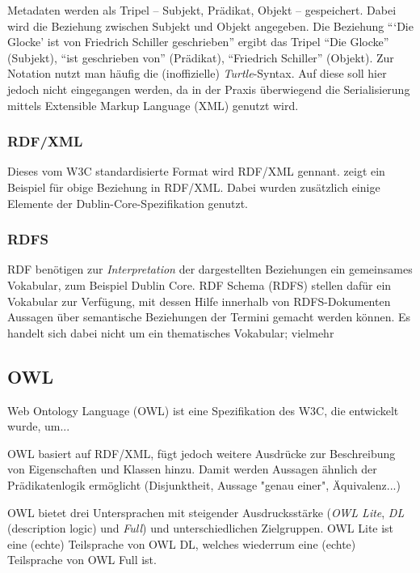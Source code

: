 	Metadaten werden als Tripel -- Subjekt, Prädikat, Objekt -- gespeichert. Dabei wird die Beziehung zwischen Subjekt und Objekt angegeben. Die Beziehung \enquote{\enquote{Die Glocke} ist von Friedrich Schiller geschrieben} ergibt das Tripel \enquote{Die Glocke} (Subjekt), \enquote{ist geschrieben von} (Prädikat), \enquote{Friedrich Schiller} (Objekt). Zur Notation nutzt man häufig die (inoffizielle) \emph{Turtle}-Syntax. %
	Auf diese soll hier jedoch nicht eingegangen werden, da in der Praxis überwiegend die Serialisierung mittels Extensible Markup Language (XML) genutzt wird.
	
	\subsubsection{RDF/XML}
	Dieses vom W3C standardisierte Format wird RDF/XML gennant.  zeigt ein Beispiel für obige Beziehung in RDF/XML. Dabei wurden zusätzlich einige Elemente der Dublin-Core-Spezifikation genutzt.
	

	\subsubsection{RDFS}
	RDF benötigen zur \emph{Interpretation} der dargestellten Beziehungen ein gemeinsames Vokabular, zum Beispiel Dublin Core. RDF Schema (RDFS) stellen dafür ein Vokabular zur Verfügung, mit dessen Hilfe innerhalb von RDFS-Dokumenten Aussagen über semantische Beziehungen der Termini gemacht werden können. Es handelt sich dabei nicht um ein thematisches Vokabular; vielmehr 

	\subsection{OWL}
	Web Ontology Language (OWL) ist eine Spezifikation des W3C, die entwickelt wurde, um...
	
	OWL basiert auf RDF/XML, fügt jedoch weitere Ausdrücke zur Beschreibung von Eigenschaften und Klassen hinzu. Damit werden Aussagen ähnlich der Prädikatenlogik ermöglicht (Disjunktheit, Aussage "genau einer", Äquivalenz...)
	
	OWL bietet drei Untersprachen mit steigender Ausdrucksstärke (\emph{OWL Lite}, \emph{DL} (description logic) und \emph{Full}) und unterschiedlichen Zielgruppen. OWL Lite ist eine (echte) Teilsprache von OWL DL, welches wiederrum eine (echte) Teilsprache von OWL Full ist.
	

